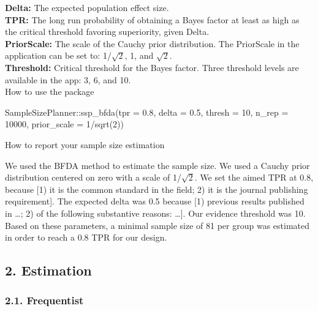 \documentclass[
  english,
  man,floatsintext]{apa6}
\newenvironment{Shaded}{\begin{snugshade}}{\end{snugshade}}
\newcommand{\AttributeTok}[1]{\textcolor[rgb]{0.77,0.63,0.00}{#1}}
\newcommand{\DecValTok}[1]{\textcolor[rgb]{0.00,0.00,0.81}{#1}}
\newcommand{\FloatTok}[1]{\textcolor[rgb]{0.00,0.00,0.81}{#1}}
\newcommand{\FunctionTok}[1]{\textcolor[rgb]{0.00,0.00,0.00}{#1}}
\newcommand{\NormalTok}[1]{#1}
\newcommand{\SpecialCharTok}[1]{\textcolor[rgb]{0.00,0.00,0.00}{#1}}
\begin{document}
\textbf{Delta:} The expected population effect size.\\
\textbf{TPR:} The long run probability of obtaining a Bayes factor at least as high as the critical threshold favoring superiority, given Delta.\\
\textbf{PriorScale:} The scale of the Cauchy prior distribution. The PriorScale in the application can be set to: 1/\(\sqrt{2}\), 1, and \(\sqrt{2}\).\\
\textbf{Threshold:} Critical threshold for the Bayes factor. Three threshold levels are available in the app: 3, 6, and 10.\\

How to use the package

\begin{Shaded}
\begin{Highlighting}[]
\NormalTok{SampleSizePlanner}\SpecialCharTok{::}\FunctionTok{ssp\_bfda}\NormalTok{(}\AttributeTok{tpr =} \FloatTok{0.8}\NormalTok{, }\AttributeTok{delta =} \FloatTok{0.5}\NormalTok{, }\AttributeTok{thresh =} \DecValTok{10}\NormalTok{,}
    \AttributeTok{n\_rep =} \DecValTok{10000}\NormalTok{, }\AttributeTok{prior\_scale =} \DecValTok{1}\SpecialCharTok{/}\FunctionTok{sqrt}\NormalTok{(}\DecValTok{2}\NormalTok{))}
\end{Highlighting}
\end{Shaded}

How to report your sample size estimation

We used the BFDA method to estimate the sample size. We used a Cauchy prior distribution centered on zero with a scale of 1/\(\sqrt{2}\). We set the aimed TPR at 0.8, because {[}1) it is the common standard in the field; 2) it is the journal publishing requirement{]}. The expected delta was 0.5 because {[}1) previous results published in \ldots; 2) of the following substantive reasons: \ldots{]}. Our evidence threshold was 10. Based on these parameters, a minimal sample size of 81 per group was estimated in order to reach a 0.8 TPR for our design.

\hypertarget{estimation}{%
\subsection{2. Estimation}\label{estimation}}

\hypertarget{frequentist-1}{%
\subsubsection{2.1. Frequentist}\label{frequentist-1}}
\end{document}
